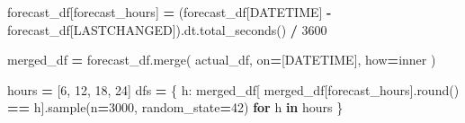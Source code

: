 \documentclass[mstat,12pt]{unswthesis}
\newenvironment{Shaded}{\begin{snugshade}}{\end{snugshade}}
\newcommand{\BuiltInTok}[1]{#1}
\newcommand{\ControlFlowTok}[1]{\textcolor[rgb]{0.13,0.29,0.53}{\textbf{#1}}}
\newcommand{\DecValTok}[1]{\textcolor[rgb]{0.00,0.00,0.81}{#1}}
\newcommand{\KeywordTok}[1]{\textcolor[rgb]{0.13,0.29,0.53}{\textbf{#1}}}
\newcommand{\NormalTok}[1]{#1}
\newcommand{\OperatorTok}[1]{\textcolor[rgb]{0.81,0.36,0.00}{\textbf{#1}}}
\newcommand{\StringTok}[1]{\textcolor[rgb]{0.31,0.60,0.02}{#1}}
\begin{document}
\begin{Shaded}
\begin{Highlighting}[]
\NormalTok{forecast\_df[}\StringTok{\textquotesingle{}forecast\_hours\textquotesingle{}}\NormalTok{] }\OperatorTok{=}\NormalTok{ (forecast\_df[}\StringTok{\textquotesingle{}DATETIME\textquotesingle{}}\NormalTok{] }\OperatorTok{{-}} 
\NormalTok{    forecast\_df[}\StringTok{\textquotesingle{}LASTCHANGED\textquotesingle{}}\NormalTok{]).dt.total\_seconds() }\OperatorTok{/} \DecValTok{3600}


\NormalTok{merged\_df }\OperatorTok{=}\NormalTok{ forecast\_df.merge(}
\NormalTok{    actual\_df,}
\NormalTok{    on}\OperatorTok{=}\NormalTok{[}\StringTok{\textquotesingle{}DATETIME\textquotesingle{}}\NormalTok{],}
\NormalTok{    how}\OperatorTok{=}\StringTok{\textquotesingle{}inner\textquotesingle{}}
\NormalTok{)}


\NormalTok{hours }\OperatorTok{=}\NormalTok{ [}\DecValTok{6}\NormalTok{, }\DecValTok{12}\NormalTok{, }\DecValTok{18}\NormalTok{, }\DecValTok{24}\NormalTok{]}
\NormalTok{dfs }\OperatorTok{=}\NormalTok{ \{}
\NormalTok{    h: merged\_df[}
\NormalTok{        merged\_df[}\StringTok{\textquotesingle{}forecast\_hours\textquotesingle{}}\NormalTok{].}\BuiltInTok{round}\NormalTok{() }\OperatorTok{==}\NormalTok{ h].sample(n}\OperatorTok{=}\DecValTok{3000}\NormalTok{,}
\NormalTok{          random\_state}\OperatorTok{=}\DecValTok{42}\NormalTok{)}
    \ControlFlowTok{for}\NormalTok{ h }\KeywordTok{in}\NormalTok{ hours}
\NormalTok{\}}



\end{Highlighting}
\end{Shaded}
\end{document}
